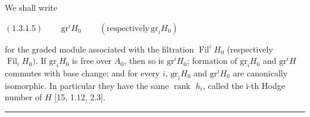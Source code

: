 \documentclass[9pt]{article}
\newcommand{\CanonText}[1]{\par{\fontsize{8.0}{9.35}\selectfont\RaggedRight #1\par}\vspace{2.2pt}}
\newcommand{\CanonDisplay}[1]{\par\vspace{1.2pt}\begin{center}{\fontsize{7.2}{8.4}\selectfont\(\displaystyle #1\)}\end{center}\vspace{1.2pt}}
\begin{document}
\begin{minipage}[t][\dimexpr\textheight-5pt\relax][t]{\textwidth}
\CanonText{We shall write}
\CanonDisplay{(1.3.1.5)\qquad\,\text{gr}^{i}H_{0}\qquad\,(\text{respectively}\,\text{gr}_{i}H_{0})}
\CanonText{for the graded module associated with the filtration \(\operatorname{Fil}^{i}H_{0}\) (respectively \(\operatorname{Fil}_{i}H_{0})\). If \(\text{gr}_{i}H_{0}\) is free over \(A_{0}\), then so is \(\text{gr}^{i}H_{0}\); formation of \(\text{gr}_{i}H_{0}\) and \(\text{gr}^{i}H\) commutes with base change; and for every \(i\), \(\text{gr}_{i}H_{0}\) and \(\text{gr}^{i}H_{0}\) are canonically isomorphic. In particular they have the same \(\operatorname{rank}\) \(h_{i}\), called the i-th Hodge number of \(H\) [15, 1.12, 2.3].}
\vfill
{\color{Accent}\hrule height 0.35pt}\vspace{3pt}
\end{minipage}
\newpage
\end{document}
